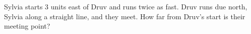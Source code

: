 Sylvia starts 3 units east of Druv and runs twice as fast. Druv runs due north, Sylvia along a straight line, and they meet. How far from Druv's start is their meeting point?
